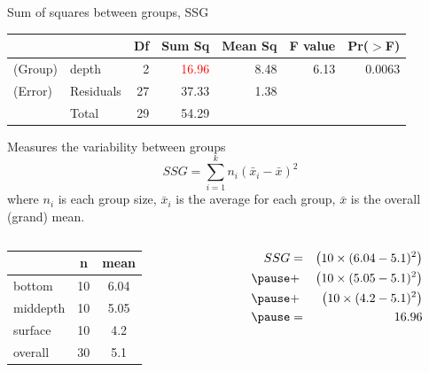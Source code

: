 \documentclass[
  ignorenonframetext,
]{beamer}
\begin{document}
\begin{frame}{Sum of squares between groups, SSG}
\protect\hypertarget{sum-of-squares-between-groups-ssg}{}
\footnotesize
\begin{center}
\begin{tabular}{ll rrrrr}
\hline
            &           & Df    & Sum Sq    & Mean Sq   & F value   & Pr($>$F) \\ 
\hline
(\alert{G}roup)     & depth         & 2     & \textcolor{red}{16.96}    & 8.48      & 6.13  & 0.0063 \\ 
(\alert{E}rror)     & Residuals     & 27    & 37.33     & 1.38      &       &  \\ 
\hline
            & \alert{T}otal & 29    & 54.29 \\
\end{tabular}
\end{center}

\normalsize

Measures the variability between groups \vspace{-0.25cm}
\[ SSG = \sum_{i = 1}^{k} n_i (\bar{x}_i - \bar{x})^2 \] where \(n_i\)
is each group size, \(\bar{x}_i\) is the average for each group,
\(\bar{x}\) is the overall (grand) mean.

\pause

\vspace{-0.5cm}

\begin{columns}

\begin{column}{0.4\textwidth}
\small
\begin{center}
\begin{tabular}{l | c c }
        & n & mean      \\
\hline
bottom  & 10    & 6.04   \\
middepth& 10    & 5.05   \\
surface & 10    & 4.2    \\
\hline
overall & 30    & 5.1   
\end{tabular}
\end{center}
\end{column}

\pause

\normalsize
\begin{column}{0.5\textwidth}
\begin{eqnarray*}
SSG &=& \left( 10 \times (6.04 - 5.1)^2 \right) \\
\pause
&+& \left( 10 \times (5.05 - 5.1)^2 \right) \\
\pause
&+& \left( 10 \times (4.2 - 5.1)^2 \right) \\
\pause
&=& 16.96 \\
\end{eqnarray*}
\end{column}

\end{columns}
\end{frame}
\end{document}
